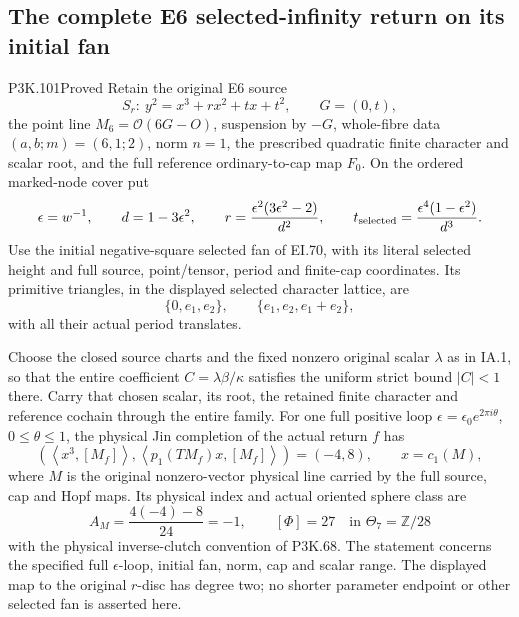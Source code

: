 \subsection{The complete E6 selected-infinity return on its initial fan}
\begin{statement}{P3K.101}{Proved}
Retain the original E6 source
\[
 S_r:\ y^2=x^3+rx^2+tx+t^2,\qquad G=(0,t),
\]
the point line \(M_6=\mathcal O(6G-O)\), suspension by \(-G\),
whole-fibre data \((a,b;m)=(6,1;2)\), norm \(n=1\), the prescribed
quadratic finite character and scalar root, and the full reference
ordinary-to-cap map \(F_0\). On the ordered marked-node cover put
\[
 \epsilon=w^{-1},\qquad d=1-3\epsilon^2,\qquad
 r=\frac{\epsilon^2(3\epsilon^2-2)}{d^2},\qquad
 t_{\rm selected}=\frac{\epsilon^4(1-\epsilon^2)}{d^3}.
\]
Use the initial negative-square selected fan of EI.70, with its
literal selected height and full source, point/tensor, period and
finite-cap coordinates. Its primitive triangles, in the displayed
selected character lattice, are
\[
 \{0,e_1,e_2\},\qquad\{e_1,e_2,e_1+e_2\},
\]
with all their actual period translates.

Choose the closed source charts and the fixed nonzero original
scalar \(\lambda\) as in IA.1, so that the entire coefficient
\(C=\lambda\beta/\kappa\) satisfies the uniform strict bound
\(|C|<1\) there. Carry that chosen scalar, its root, the retained
finite character and reference cochain through the entire family.
For one full positive loop
\(\epsilon=\epsilon_0 e^{2\pi i\theta}\), \(0\le\theta\le1\),
the physical Jin completion of the actual return \(f\) has
\[
 \left(\left\langle x^3,[M_f]\right\rangle,
       \left\langle p_1(TM_f)x,[M_f]\right\rangle\right)=(-4,8),
 \qquad x=c_1(M),
\]
where \(M\) is the original nonzero-vector physical line carried by
the full source, cap and Hopf maps. Its physical index and actual
oriented sphere class are
\[
 A_M=\frac{4(-4)-8}{24}=-1,\qquad
 [\Phi]=27\quad\text{in }\Theta_7=\mathbb Z/28
\]
with the physical inverse-clutch convention of P3K.68.
The statement concerns the specified full \(\epsilon\)-loop,
initial fan, norm, cap and scalar range. The displayed map to the
original \(r\)-disc has degree two; no shorter parameter endpoint
or other selected fan is asserted here.
\end{statement}
